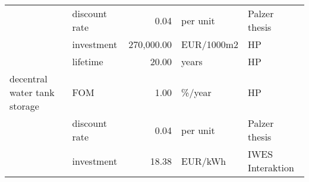 \begin{longtable}{p{5cm}p{3cm}rp{3cm}p{11cm}}
                      & discount rate &           0.04 &                          per unit &                                                                                                                                                                                                                                                                                                                        Palzer thesis \\
                      & investment &     270,000.00 &                        EUR/1000m2 &                                                                                                                                                                                                                                                                                                                                   HP \\
                      & lifetime &          20.00 &                             years &                                                                                                                                                                                                                                                                                                                                   HP \\
decentral water tank storage & FOM &           1.00 &                            \%/year &                                                                                                                                                                                                                                                                                                                                   HP \\
                      & discount rate &           0.04 &                          per unit &                                                                                                                                                                                                                                                                                                                        Palzer thesis \\
                      & investment &          18.38 &                           EUR/kWh &                                                                                                                                                                                                                                                                                                                     IWES Interaktion \\

\end{longtable}
